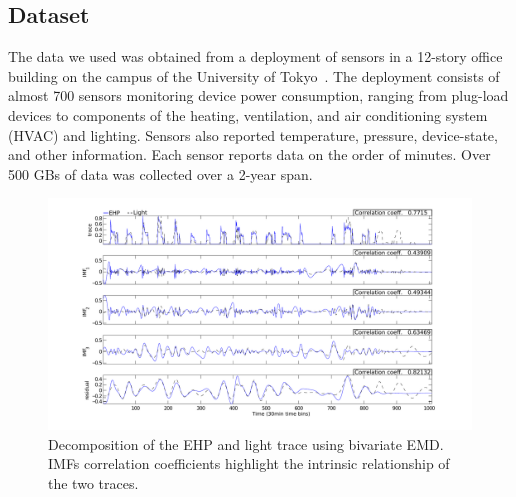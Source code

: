 \subsection{Dataset}
The data we used was obtained from a deployment of sensors in a 12-story office building
on the campus of the University of Tokyo~\cite{gutp, ogawa:lncs2011}.  The deployment consists of 
almost 700 sensors monitoring device power consumption, ranging from plug-load devices to components of the
heating, ventilation, and air conditioning system (HVAC) and lighting.  Sensors also reported temperature, 
pressure, device-state, and other information.  Each sensor reports data on the
order of minutes.  Over 500 GBs of data was collected over a 2-year span.

\begin{figure}[tb]
\hspace{-2cm}
\includegraphics[width=1.2\textwidth]{figs/emd_25_26-eps-converted-to}
\vspace{-1cm}
\caption{Decomposition of the EHP and light trace using bivariate EMD. IMFs correlation coefficients highlight the intrinsic relationship of the two traces.}
\label{fig:emd}
\end{figure}



